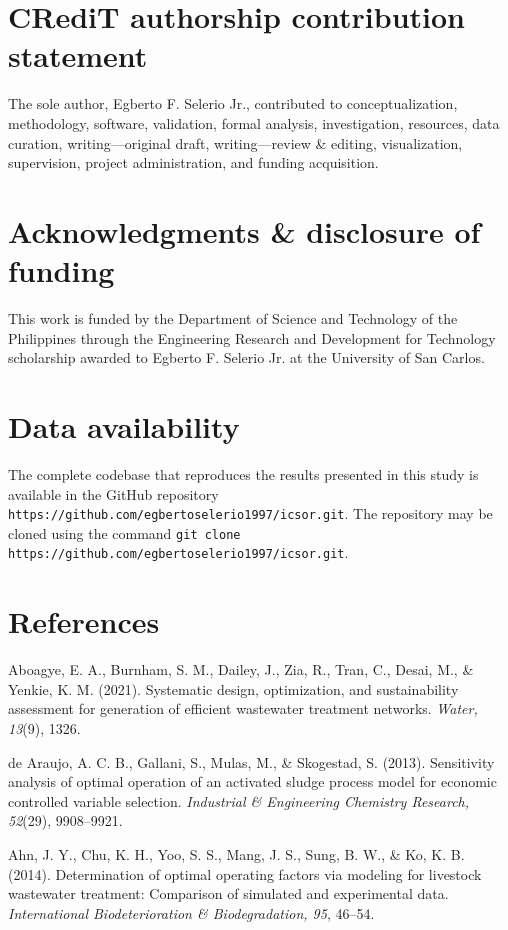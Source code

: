 \documentclass[a4paper,fleqn]{cas-sc}
\begin{document}
\section*{CRediT authorship contribution statement}

The sole author, Egberto F. Selerio Jr., contributed to conceptualization, methodology, software, validation, formal analysis, investigation, resources, data curation, writing---original draft, writing---review \& editing, visualization, supervision, project administration, and funding acquisition.

\section*{Acknowledgments \& disclosure of funding}

This work is funded by the Department of Science and Technology of the Philippines through the Engineering Research and Development for Technology scholarship awarded to Egberto F. Selerio Jr. at the University of San Carlos.

\section*{Data availability}

The complete codebase that reproduces the results presented in this study is available in the GitHub repository \texttt{https://github.com/egbertoselerio1997/icsor.git}. The repository may be cloned using the command \texttt{git clone https://github.com/egbertoselerio1997/icsor.git}.

\section*{References}

\noindent Aboagye, E. A., Burnham, S. M., Dailey, J., Zia, R., Tran, C., Desai, M., \& Yenkie, K. M. (2021). Systematic design, optimization, and sustainability assessment for generation of efficient wastewater treatment networks. \textit{Water, 13}(9), 1326.

\noindent de Araujo, A. C. B., Gallani, S., Mulas, M., \& Skogestad, S. (2013). Sensitivity analysis of optimal operation of an activated sludge process model for economic controlled variable selection. \textit{Industrial \& Engineering Chemistry Research, 52}(29), 9908--9921.

\noindent Ahn, J. Y., Chu, K. H., Yoo, S. S., Mang, J. S., Sung, B. W., \& Ko, K. B. (2014). Determination of optimal operating factors via modeling for livestock wastewater treatment: Comparison of simulated and experimental data. \textit{International Biodeterioration \& Biodegradation, 95}, 46--54.
\end{document}

